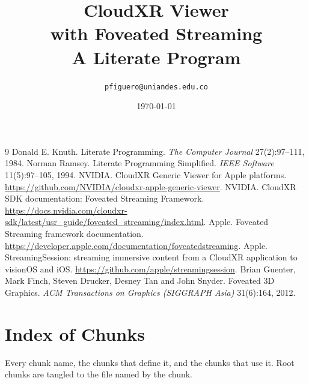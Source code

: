 \documentclass[11pt,a4paper,openany]{book}
\title{\Huge CloudXR Viewer\\[0.3em]\huge with Foveated Streaming\\[0.8em]\Large A Literate Program}
\author{\texttt{pfiguero@uniandes.edu.co}}
\date{\today}
\begin{document}
\frontmatter
\maketitle
\tableofcontents
\mainmatter

\backmatter
\cleardoublepage{}
{}
\begin{thebibliography}{9}
 Donald E. Knuth. Literate Programming. \emph{The Computer Journal} 27(2):97--111, 1984.
 Norman Ramsey. Literate Programming Simplified. \emph{IEEE Software} 11(5):97--105, 1994.
 NVIDIA. CloudXR Generic Viewer for Apple platforms.
  \url{https://github.com/NVIDIA/cloudxr-apple-generic-viewer}.
 NVIDIA. CloudXR SDK documentation: Foveated Streaming Framework.
  \url{https://docs.nvidia.com/cloudxr-sdk/latest/usr_guide/foveated_streaming/index.html}.
 Apple. Foveated Streaming framework documentation.
  \url{https://developer.apple.com/documentation/foveatedstreaming}.
 Apple. StreamingSession: streaming immersive content from a CloudXR application to visionOS and iOS.
  \url{https://github.com/apple/streamingsession}.
 Brian Guenter, Mark Finch, Steven Drucker, Desney Tan and John Snyder. Foveated 3D Graphics.
  \emph{ACM Transactions on Graphics (SIGGRAPH Asia)} 31(6):164, 2012.
\end{thebibliography}
\chapter*{Index of Chunks}
Every chunk name, the chunks that define it, and the chunks that use it.
Root chunks are tangled to the file named by the chunk.

\end{document}
